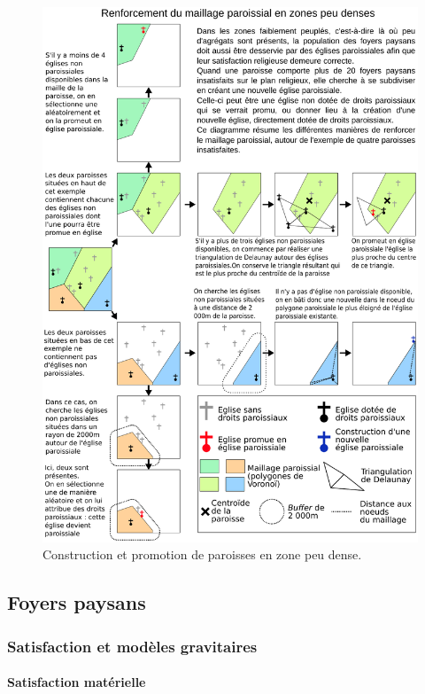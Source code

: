 	\begin{figure}[H]
		\centering
		\includegraphics[width=1\linewidth]{img/constru-promo_paroisses_rurales.pdf}
		\caption{Construction et promotion de paroisses en zone peu dense.}
		\label{fig:promotion-paroisses}
	\end{figure}
	
\clearpage
\subsection{Foyers paysans}
	\subsubsection{Satisfaction et modèles gravitaires \label{sssec:satisfaction}}
		\paragraph{Satisfaction matérielle}
